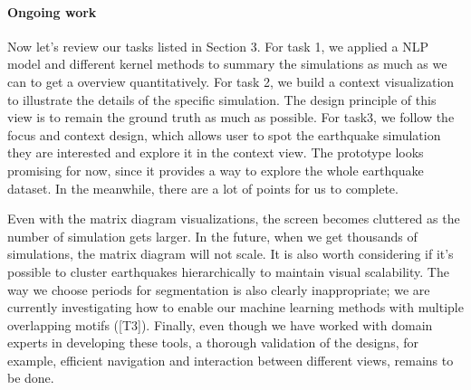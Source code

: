 \paragraph*{Ongoing work}
\label{sec:conclusion}

Now let's review our tasks listed in Section 3. For task 1, we applied a NLP model and different kernel methods to summary the simulations as much as we can to get a overview quantitatively. For task 2, we build a context visualization to illustrate the details of the specific simulation. The design principle of this view is to remain the ground truth as much as possible. For task3, we follow the focus and context design, which allows user to spot the earthquake simulation they are interested and explore it in the context view. The prototype looks promising for now, since it provides a way to explore the whole earthquake dataset. In the meanwhile, there are  a lot of points for us to complete.

Even with the matrix diagram visualizations, the screen becomes cluttered as the number of simulation gets larger. In the future, when we get thousands of simulations, the matrix diagram will not scale. It is also worth considering if it's possible to cluster earthquakes hierarchically to maintain visual scalability. The way we choose periods for segmentation is also clearly inappropriate; we are currently investigating how to enable our machine learning methods with multiple overlapping motifs ([T3]).
Finally, even though we have worked with domain experts in developing these tools, a thorough validation of the designs, for example,   efficient navigation and interaction between different views, remains to be done.
